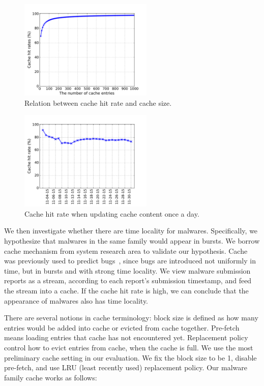\begin{figure}[t!]
\begin{center}
\includegraphics[width=2.5in]{figure/LRU}
\caption{Relation between cache hit rate and cache size.}
\label{fig:cache}
\end{center}
\end{figure}


\begin{figure}[t!]
\begin{center}
\includegraphics[width=2.5in]{figure/LRU_day}
\caption{Cache hit rate when updating cache content once a day.}
\label{fig:batchcache}
\end{center}
\end{figure}

We then investigate whether there are time locality for malwares.
Specifically, we hypothesize that malwares in the same family would appear in bursts.  
We borrow cache mechanism from system research area to validate our hypothesis. 
Cache was previously used to predict bugs~\cite{predicting}, 
since bugs are introduced not uniformly in time, but in bursts and with strong time locality. 
We view malware submission reports as a stream, 
according to each report’s submission timestamp, and feed the stream into a cache. 
If the cache hit rate is high, 
we can conclude that the appearance of malwares also has time locality. 

There are several notions in cache terminology: 
block size is defined as how many entries would be added into cache or evicted from cache together.
Pre-fetch means loading entries that cache has not encountered yet. 
Replacement policy control how to evict entries from cache, when the cache is full. 
We use the most preliminary cache setting in our evaluation. We fix the block size to be 1, disable pre-fetch, 
and use LRU (least recently used) replacement policy.
Our malware family cache works as follows:  

